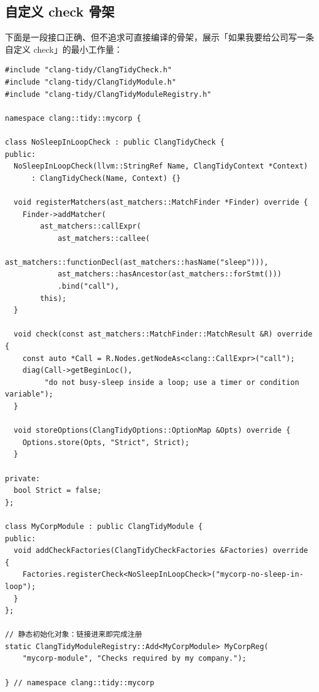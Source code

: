 \documentclass[12pt,a4paper,fontset=fandol]{ctexbook}
\newcommand{\Lib}[1]{\textbf{\texttt{#1}}}
\newcommand{\Tidy}{\Lib{clang-tidy}}
\begin{document}
\subsection{自定义 check 骨架}\label{sec:ch12-s1b}
下面是一段接口正确、但不追求可直接编译的骨架，展示「如果我要给公司写一条自定义 check」的最小工作量：
\begin{lstlisting}[style=cppstyle,caption={自定义 \Tidy\ check 骨架（示意）},label={lst:ch12-check}]
#include "clang-tidy/ClangTidyCheck.h"
#include "clang-tidy/ClangTidyModule.h"
#include "clang-tidy/ClangTidyModuleRegistry.h"

namespace clang::tidy::mycorp {

class NoSleepInLoopCheck : public ClangTidyCheck {
public:
  NoSleepInLoopCheck(llvm::StringRef Name, ClangTidyContext *Context)
      : ClangTidyCheck(Name, Context) {}

  void registerMatchers(ast_matchers::MatchFinder *Finder) override {
    Finder->addMatcher(
        ast_matchers::callExpr(
            ast_matchers::callee(
                ast_matchers::functionDecl(ast_matchers::hasName("sleep"))),
            ast_matchers::hasAncestor(ast_matchers::forStmt()))
            .bind("call"),
        this);
  }

  void check(const ast_matchers::MatchFinder::MatchResult &R) override {
    const auto *Call = R.Nodes.getNodeAs<clang::CallExpr>("call");
    diag(Call->getBeginLoc(),
         "do not busy-sleep inside a loop; use a timer or condition variable");
  }

  void storeOptions(ClangTidyOptions::OptionMap &Opts) override {
    Options.store(Opts, "Strict", Strict);
  }

private:
  bool Strict = false;
};

class MyCorpModule : public ClangTidyModule {
public:
  void addCheckFactories(ClangTidyCheckFactories &Factories) override {
    Factories.registerCheck<NoSleepInLoopCheck>("mycorp-no-sleep-in-loop");
  }
};

// 静态初始化对象：链接进来即完成注册
static ClangTidyModuleRegistry::Add<MyCorpModule> MyCorpReg(
    "mycorp-module", "Checks required by my company.");

} // namespace clang::tidy::mycorp
\end{lstlisting}
\end{document}
